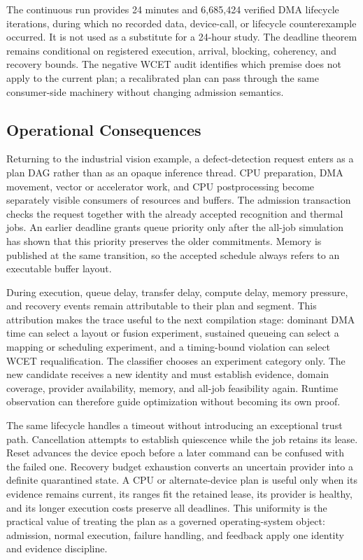 \documentclass[lettersize,journal]{IEEEtran}
\begin{document}
The continuous run provides 24 minutes and 6,685,424 verified DMA lifecycle
iterations, during which no recorded data, device-call, or lifecycle
counterexample occurred. It is not used as a substitute for a 24-hour study.
The deadline theorem remains conditional on registered execution, arrival,
blocking, coherency, and recovery bounds. The negative WCET audit identifies
which premise does not apply to the current plan; a recalibrated plan can pass
through the same consumer-side machinery without changing admission semantics.

\subsection{Operational Consequences}
Returning to the industrial vision example, a defect-detection request enters
as a plan DAG rather than as an opaque inference thread. CPU preparation, DMA
movement, vector or accelerator work, and CPU postprocessing become separately
visible consumers of resources and buffers. The admission transaction checks
the request together with the already accepted recognition and thermal jobs.
An earlier deadline grants queue priority only after the all-job simulation has
shown that this priority preserves the older commitments. Memory is published
at the same transition, so the accepted schedule always refers to an executable
buffer layout.

During execution, queue delay, transfer delay, compute delay, memory pressure,
and recovery events remain attributable to their plan and segment. This
attribution makes the trace useful to the next compilation stage: dominant DMA
time can select a layout or fusion experiment, sustained queueing can select a
mapping or scheduling experiment, and a timing-bound violation can select WCET
requalification. The classifier chooses an experiment category only. The new
candidate receives a new identity and must establish evidence, domain coverage,
provider availability, memory, and all-job feasibility again. Runtime
observation can therefore guide optimization without becoming its own proof.

The same lifecycle handles a timeout without introducing an exceptional trust
path. Cancellation attempts to establish quiescence while the job retains its
lease. Reset advances the device epoch before a later command can be confused
with the failed one. Recovery budget exhaustion converts an uncertain provider
into a definite quarantined state. A CPU or alternate-device plan is useful
only when its evidence remains current, its ranges fit the retained lease, its
provider is healthy, and its longer execution costs preserve all deadlines.
This uniformity is the practical value of treating the plan as a governed
operating-system object: admission, normal execution, failure handling, and
feedback apply one identity and evidence discipline.
\end{document}
